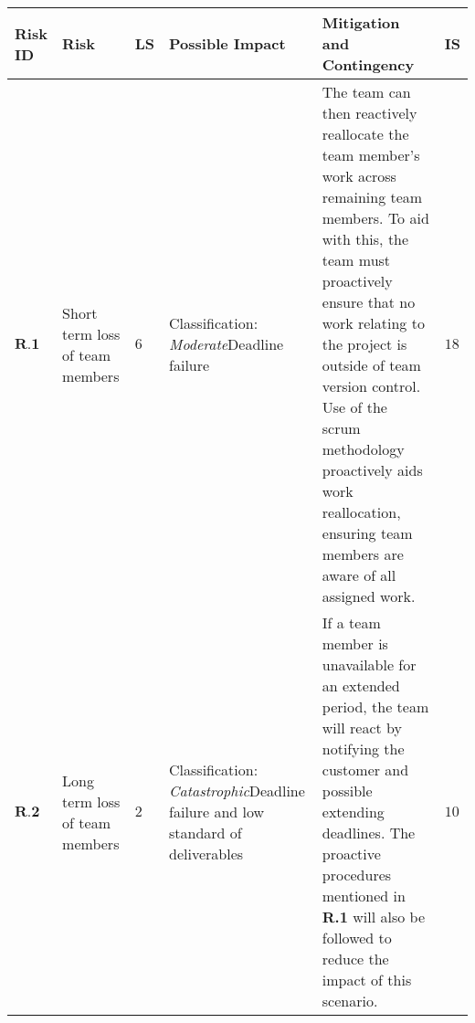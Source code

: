 \begin{longtable}[H]{| p{0.6cm} | p{2cm} | p{0.3cm} | p{2.6cm} | p{8.1cm} | p{0.7cm} |}
    \hline
    \cellcolor{titleColor}\textbf{Risk ID}   & \cellcolor{titleColor}\textbf{Risk}                                             &\cellcolor{titleColor}\textbf{LS}        & \cellcolor{titleColor}\textbf{Possible Impact}                                 & \cellcolor{titleColor}\textbf{Mitigation and Contingency} & \cellcolor{titleColor}\textbf{IS} \\ \hline                                                                                                                                                                                                                                                                                                                                                                                                                                                                                                                                
    $ \textbf{R.1}  $ & Short term loss of team members                  & $6$       & Classification: \newline\textit{Moderate}\newline Deadline failure                                        
      &  The team can then reactively reallocate the team member's work across remaining team members. To aid with this, the team must proactively ensure that no work relating to the project is outside of team version control. Use of the scrum methodology proactively aids work reallocation, ensuring team members are aware of all assigned work. 
      & $18$    \\ \hline
   $ \textbf{R.2}  $  & Long term loss of team members                   & $2$ & Classification: \newline\textit{Catastrophic}\newline Deadline failure and low standard of deliverables 
    & If a team member is unavailable for an extended period, the team will react by notifying the customer and possible extending deadlines. The proactive procedures mentioned in \textbf{R.1} will also be followed to reduce the impact of this scenario.                                                                                                                                                                                                                                                                                            
    & $10$   \\ \hline

\end{longtable}
